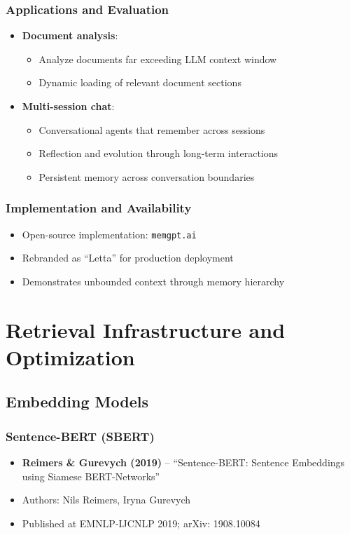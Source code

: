 \documentclass[11pt,letterpaper]{article}
\begin{document}
\subsubsection{Applications and Evaluation}
\begin{itemize}[leftmargin=*]
    \item \textbf{Document analysis}:
    \begin{itemize}
        \item Analyze documents far exceeding LLM context window
        \item Dynamic loading of relevant document sections
    \end{itemize}
    \item \textbf{Multi-session chat}:
    \begin{itemize}
        \item Conversational agents that remember across sessions
        \item Reflection and evolution through long-term interactions
        \item Persistent memory across conversation boundaries
    \end{itemize}
\end{itemize}

\subsubsection{Implementation and Availability}
\begin{itemize}[leftmargin=*]
    \item Open-source implementation: \texttt{memgpt.ai}
    \item Rebranded as ``Letta'' for production deployment
    \item Demonstrates unbounded context through memory hierarchy
\end{itemize}

\section{Retrieval Infrastructure and Optimization}

\subsection{Embedding Models}

\subsubsection{Sentence-BERT (SBERT)}
\begin{itemize}[leftmargin=*]
    \item \textbf{Reimers \& Gurevych (2019)} -- ``Sentence-BERT: Sentence Embeddings using Siamese BERT-Networks'' \cite{reimers2019sbert}
    \item Authors: Nils Reimers, Iryna Gurevych
    \item Published at EMNLP-IJCNLP 2019; arXiv: 1908.10084
\end{itemize}
\end{document}
